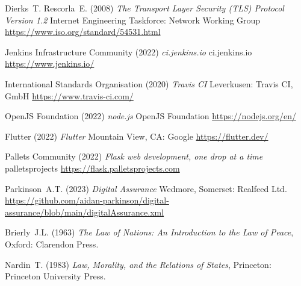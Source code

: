 \documentclass[11pt, oneside]{article}   	%
\begin{document}
\begin{thebibliography}{99}
 Dierks~T. Rescorla~E. (2008)
\emph{The Transport Layer Security (TLS) Protocol Version 1.2}
Internet Engineering Taskforce: Network Working Group
\url{https://www.iso.org/standard/54531.html}

 Jenkins Infrastructure Community (2022)
\emph{ci.jenkins.io}
ci.jenkins.io
\url{https://www.jenkins.io/}

 International Standards Organisation (2020)
\emph{Travis CI}
Leverkusen: Travis CI, GmbH
\url{https://www.travis-ci.com/}


 OpenJS Foundation (2022)
\emph{node.js}
OpenJS Foundation
\url{https://nodejs.org/en/}

 Flutter (2022)
\emph{Flutter}
Mountain View, CA: Google 
\url{https://flutter.dev/}

 Pallets Community (2022)
\emph{Flask web development, one drop at a time}
palletsprojects
\url{https://flask.palletsprojects.com}

 Parkinson~A.T. (2023)
\emph{Digital Assurance}
Wedmore, Somerset: Realfeed Ltd.
\url{https://github.com/aidan-parkinson/digital-assurance/blob/main/digitalAssurance.xml}

 Brierly~J.L. (1963)
\emph{The Law of Nations: An Introduction to the Law of Peace},
Oxford: Clarendon Press.

 Nardin~T. (1983)
\emph{Law, Morality, and the Relations of States},
Princeton: Princeton University Press.

\end{thebibliography}

\newpage
\thispagestyle{empty}
\mbox{}
\newpage
\end{document}
